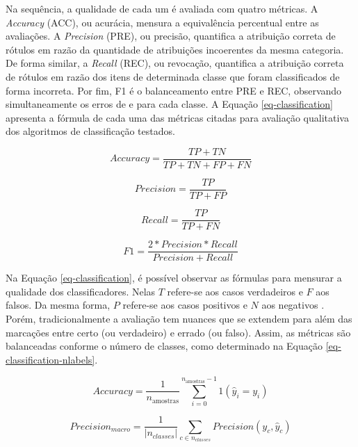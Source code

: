 Na sequência, a qualidade de cada um é avaliada com quatro métricas. A \textit{Accuracy} (ACC), ou acurácia, mensura a equivalência percentual entre as avaliações. A \textit{Precision} (PRE), ou precisão, quantifica a atribuição correta de rótulos em razão da quantidade de atribuições incoerentes da mesma categoria. De forma similar, a \textit{Recall} (REC), ou revocação, quantifica a atribuição correta de rótulos em razão dos itens de determinada classe que foram classificados de forma incorreta. Por fim, F1 é o balanceamento entre PRE e REC, observando simultaneamente os erros de e para cada classe. A Equação \ref{eq-classification} apresenta a fórmula de cada uma das métricas citadas para avaliação qualitativa dos algoritmos de classificação testados.

\begin{equation}
Accuracy = \frac{TP+TN}{TP+TN+FP+FN}
\label{eq-classification}
\end{equation}

\begin{equation*}
Precision = \frac{TP}{TP+FP}
\end{equation*}

\begin{equation*}
Recall = \frac{TP}{TP+FN}
\end{equation*}

\begin{equation*}
F{1} = \frac{2*Precision*Recall}{Precision+Recall}
\end{equation*}

Na Equação \ref{eq-classification}, é possível observar as fórmulas para mensurar a qualidade dos classificadores. Nelas $ T $ refere-se aos casos verdadeiros e $ F $ aos falsos. Da mesma forma, $ P $ refere-se aos casos positivos e $ N $ aos negativos \cite{manning2008}. Porém, tradicionalmente a avaliação tem nuances que se extendem para além das marcações entre certo (ou verdadeiro) e errado (ou falso). Assim, as métricas são balanceadas conforme o número de classes, como determinado na Equação \ref{eq-classification-nlabels}. 

\begin{equation}
Accuracy = \frac{1}{n_\text{amostras}} \sum_{i=0}^{n_\text{amostras}-1} 1(\hat{y}_i = y_i)
\label{eq-classification-nlabels}
\end{equation}

\begin{equation*}
Precision_{macro} = \frac{1}{\left|n_{classes}\right|} \sum_{c \in n_{classes}} Precision(y_c, \hat{y}_c)
\end{equation*}

